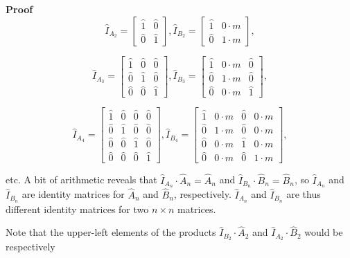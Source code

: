 \documentclass[10pt,letterpaper]{article}
\newenvironment{proof}{\noindent\textbf{Proof} }{\qed \newline}
\newcommand{\qed}{\nobreak \ifvmode \relax \else
      \ifdim\lastskip<1.5em \hskip-\lastskip
      \hskip1.5em plus0em minus0.5em \fi \nobreak
      \vrule height0.75em width0.5em depth0.25em\fi}
\numberwithin{equation}{section}
\begin{document}
\begin{proof}
\[ \hat I_{A_2} = \left[ \begin{matrix} 
  \hat 1 & \hat 0 \\
  \hat 0 & \hat 1
 \end{matrix} \right] ,
\hat I_{B_2} = \left[ \begin{matrix} 
  \hat 1 & 0 \cdot m \\
  \hat 0 & 1 \cdot m
 \end{matrix} \right] , \]
 
 \[ \hat I_{A_3} = \left[ \begin{matrix} 
  \hat 1 & \hat 0 & \hat 0 \\
  \hat 0 & \hat 1 & \hat 0 \\
  \hat 0 & \hat 0 & \hat 1
 \end{matrix} \right] ,
 \hat I_{B_3} = \left[ \begin{matrix} 
  \hat 1 & 0 \cdot m & \hat 0 \\
  \hat 0 & 1 \cdot m & \hat 0 \\
  \hat 0 & 0 \cdot m & \hat 1
 \end{matrix} \right] , \]
 
 \[ \hat I_{A_4} = \left[ \begin{matrix} 
  \hat 1 & \hat 0 & \hat 0 & \hat 0 \\
  \hat 0 & \hat 1 & \hat 0 & \hat 0 \\
  \hat 0 & \hat 0 & \hat 1 & \hat 0 \\
  \hat 0 & \hat 0 & \hat 0 & \hat 1
 \end{matrix} \right] ,
 \hat I_{B_4} = \left[ \begin{matrix} 
  \hat 1 & 0 \cdot m & \hat 0 & 0 \cdot m \\
  \hat 0 & 1 \cdot m & \hat 0 & 0 \cdot m \\
  \hat 0 & 0 \cdot m & \hat 1 & 0 \cdot m \\
  \hat 0 & 0 \cdot m & \hat 0 & 1 \cdot m
 \end{matrix} \right] , \]
 
etc.  A bit of arithmetic reveals that $\hat I_{A_n} \cdot \hat A_n = \hat A_n$ and $\hat I_{B_n} \cdot \hat B_n = \hat B_n$, so $\hat I_{A_n}$ and $\hat I_{B_n}$ are identity matrices for $\hat A_n$ and $\hat B_n$, respectively.  $\hat I_{A_n}$ and $\hat I_{B_n}$ are thus different identity matrices for two $n \times n$ matrices.\end{proof}

Note that the upper-left elements of the products $\hat I_{B_2} \cdot \hat A_2$ and $\hat I_{A_2} \cdot \hat B_2$ would be respectively
\end{document}
